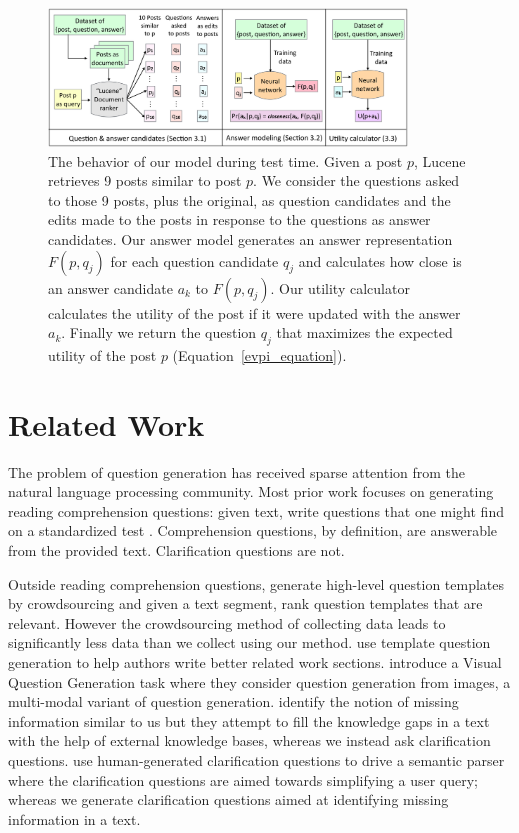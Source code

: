 \documentclass[11pt,a4paper]{article}
\begin{document}
\begin{figure}[t]
	\centering
	\includegraphics[width=0.85\textwidth]{model}
	\caption{ The behavior of our model during test time. Given a post $p$, Lucene retrieves 9 posts similar to post $p$. We consider the questions asked to those 9 posts, plus the original, as question candidates and the edits made to the posts in response to the questions as answer candidates. Our answer model generates an answer representation $F(p,q_j)$ for each question candidate $q_j$ and calculates how close is an answer candidate $a_k$ to $F(p,q_j)$. Our utility calculator calculates the utility of the post if it were updated with the answer $a_k$. Finally we return the question $q_j$ that maximizes the expected utility of the post $p$ (Equation~\ref{evpi_equation}).}
	\label{model}
\end{figure}

\section{Related Work} \label{related_work}

The problem of question generation has received sparse attention from the natural language processing community. Most prior work focuses on generating reading comprehension questions:  given text, write questions that one might find on a standardized test \cite{vanderwende2008importance,heilman2011automatic,rus2011question,olney2012question}.  Comprehension questions, by definition, are answerable from the provided text. Clarification questions are not.  

Outside reading comprehension questions,  generate high-level question templates by crowdsourcing and given a text segment, rank question templates that are relevant. However the crowdsourcing method of collecting data leads to significantly less data than we collect using our method.  use template question generation to help authors write better related work sections.  introduce a Visual Question Generation task where they consider question generation from images, a multi-modal variant of question generation. 
 identify the notion of missing information similar to us but they attempt to fill the knowledge gaps in a text with the help of external knowledge bases, whereas we instead ask clarification questions.  use human-generated clarification questions to drive a semantic parser where the clarification questions are aimed towards simplifying a user query; whereas we generate clarification questions aimed at  identifying missing information in a text. 
\end{document}
